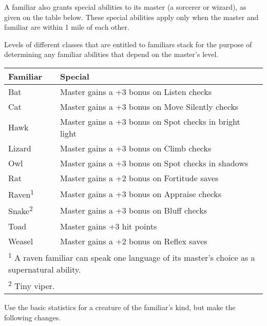 \smallskip\noindent A familiar also grants special abilities to its master (a sorcerer or wizard), as given on the table below. These special abilities apply only when the master and familiar are within 1 mile of each other.

\smallskip\noindent Levels of different classes that are entitled to familiars stack for the purpose of determining any familiar abilities that depend on the master's level.

\begin{tabular}[h!]{l|l}
Familiar & Special \\ \hline
Bat & Master gains a +3 bonus on Listen checks \\
Cat & Master gains a +3 bonus on Move Silently checks \\
Hawk & Master gains a +3 bonus on Spot checks in bright light \\
Lizard & Master gains a +3 bonus on Climb checks \\
Owl & Master gains a +3 bonus on Spot checks in shadows \\
Rat & Master gains a +2 bonus on Fortitude saves \\
Raven\textsuperscript{1} & Master gains a +3 bonus on Appraise checks	\\
Snake\textsuperscript{2} & Master gains a +3 bonus on Bluff checks \\
Toad & Master gains +3 hit points \\
Weasel & Master gains a +2 bonus on Reflex saves \\
\multicolumn{2}{l}{\textsuperscript{1} A raven familiar can speak one language of its master's choice as a supernatural ability.} \\
\multicolumn{2}{l}{\textsuperscript{2} Tiny viper.} \\
\end{tabular}

\smallskip\noindent Use the basic statistics for a creature of the familiar's kind, but make the following changes.




